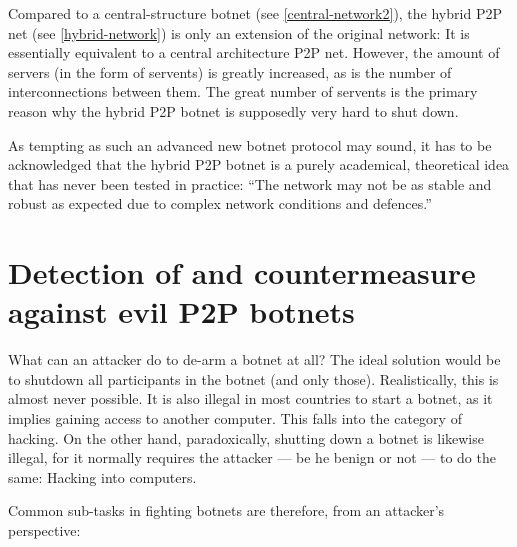 \documentclass{llncs}
\begin{document}
Compared to a central-structure botnet (see \ref{central-network2}),
the hybrid P2P net (see \ref{hybrid-network}) is only an extension of the
original network: It is essentially equivalent to a central
architecture P2P net. However, the amount of servers (in the form of
servents) is greatly increased, as is the number of interconnections
between them. The great number of servents is the primary reason why
the hybrid P2P botnet is supposedly very hard to shut
down.\cite{td1sc}

As tempting as such an advanced new botnet protocol may sound, it has
to be acknowledged that the hybrid P2P botnet is a purely academical,
theoretical idea that has never been tested in practice: ``The network
may not be as stable and robust as expected due to complex network
conditions and defences.''\cite{wang2009systematic}


\section{Detection of and countermeasure against evil P2P botnets}
\label{counter-measure}
What can an attacker do to de-arm a botnet at all? The ideal solution
would be to shutdown all participants in the botnet (and only
those). Realistically, this is almost never possible. It is also
illegal in most countries to start a botnet, as it implies gaining
access to another computer. This falls into the category of
hacking. On the other hand, paradoxically, shutting down a botnet is
likewise illegal, for it normally requires the attacker --- be he
benign or not --- to do the same: Hacking into computers. 

Common sub-tasks in fighting botnets are therefore, from an attacker's
perspective:
\end{document}
